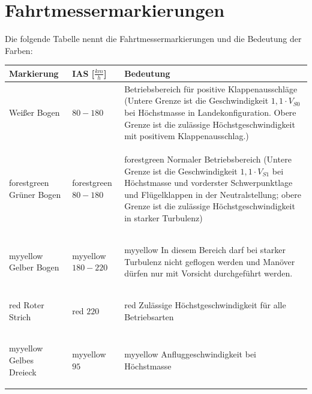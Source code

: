 \section{Fahrtmessermarkierungen}
Die folgende Tabelle nennt die Fahrtmessermarkierungen und die Bedeutung der Farben:\\

\begin{tabular}{|m{}|m{}|m{6cm}|}
\hline
Markierung & IAS [$\unit{\frac{km}{h}}$] & Bedeutung \\
\hline
Weißer Bogen & $80-180$ & Betriebsbereich für positive Klappenausschläge (Untere Grenze ist die Geschwindigkeit $1,1 \cdot V_{S0}$ bei Höchstmasse in Landekonfiguration. Obere Grenze ist die zulässige Höchstgeschwindigkeit mit positivem Klappenausschlag.)\\
\hline
\begin{color}{forestgreen} Grüner Bogen \end{color} & \begin{color}{forestgreen} $80-180$ \end{color} & \begin{color}{forestgreen} Normaler Betriebsbereich (Untere Grenze ist die Geschwindigkeit $1,1 \cdot V_{S1}$ bei Höchstmasse und vorderster Schwerpunktlage und Flügelklappen in der Neutralstellung; obere Grenze ist die zulässige Höchstgeschwindigkeit in starker Turbulenz) \end{color} \\ 
\hline
\begin{color}{myyellow} Gelber Bogen \end{color} & \begin{color}{myyellow} $180-220$ \end{color} & \begin{color}{myyellow} In diesem Bereich darf bei starker Turbulenz nicht geflogen werden und Manöver dürfen nur mit Vorsicht durchgeführt werden. \end{color}\\
\hline
\begin{color}{red} Roter Strich \end{color} & \begin{color}{red} $220$ \end{color} & \begin{color}{red} Zulässige Höchstgeschwindigkeit für alle Betriebsarten \end{color}\\
\hline
\begin{color}{myyellow} Gelbes Dreieck \end{color} & \begin{color}{myyellow} $95$ \end{color} & \begin{color}{myyellow} Anfluggeschwindigkeit bei Höchstmasse \end{color}\\
\hline
\end{tabular}
\newline

